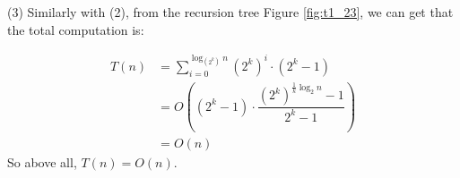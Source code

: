 (3) Similarly with (2), from the recursion tree Figure \ref{fig:t1_23}, we can get that the total computation is:

\begin{align*}
    T(n) &= \sum_{i=0}^{\log_{(2^k)}{n}}(2^k)^i\cdot (2^k-1)\\
         &= O((2^k-1)\cdot \dfrac{(2^k)^{\frac{1}{k}\log_{2}{n}}-1}{2^k-1})\\
         &= O(n)
\end{align*}
So above all, $T(n)=O(n)$.\\



\newpage